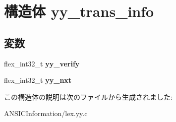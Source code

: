 \section{構造体 yy\_\-trans\_\-info}
\label{structyy__trans__info}
\subsection*{変数}
\begin{DoxyCompactItemize}
\item 
flex\_\-int32\_\-t {\bfseries yy\_\-verify}\label{structyy__trans__info_a5faf5583708f5fa457bc1cb9bab86e38}

\item 
flex\_\-int32\_\-t {\bfseries yy\_\-nxt}\label{structyy__trans__info_a51bfd9e47041873b7b8075c677d1cfe1}

\end{DoxyCompactItemize}


この構造体の説明は次のファイルから生成されました:\begin{DoxyCompactItemize}
\item 
ANSICInformation/lex.yy.c\end{DoxyCompactItemize}

